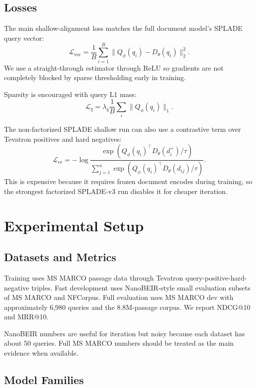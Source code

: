 \documentclass[
]{ceurart}
\begin{document}
\subsection{Losses}

The main shallow-alignment loss matches the full document model's SPLADE query
vector:
\begin{equation}
  \mathcal{L}_{\mathrm{vec}} =
  \frac{1}{B}\sum_{i=1}^B \|Q_\phi(q_i) - D_\theta(q_i)\|_2^2.
\end{equation}
We use a straight-through estimator through ReLU so gradients are not completely
blocked by sparse thresholding early in training.

Sparsity is encouraged with query L1 mass:
\begin{equation}
  \mathcal{L}_{q} = \lambda_q \frac{1}{B}\sum_i \|Q_\phi(q_i)\|_1.
\end{equation}

The non-factorized SPLADE shallow run can also use a contrastive term over
Tevatron positives and hard negatives:
\begin{equation}
  \mathcal{L}_{\mathrm{ce}} =
  -\log
  \frac{\exp(Q_\phi(q_i)^\top D_\theta(d_i^+) / \tau)}
       {\sum_{j=1}^{n}\exp(Q_\phi(q_i)^\top D_\theta(d_{ij}) / \tau)}.
\end{equation}
This is expensive because it requires frozen document encodes during training,
so the strongest factorized SPLADE-v3 run disables it for cheaper iteration.

\section{Experimental Setup}

\subsection{Datasets and Metrics}

Training uses MS MARCO passage data \cite{Bajaj2016MSMARCO} through Tevatron
query-positive-hard-negative triples. Fast development uses NanoBEIR-style small
evaluation subsets of MS MARCO and NFCorpus. Full evaluation uses MS MARCO dev
with approximately 6,980 queries and the 8.8M-passage corpus. We report NDCG@10
and MRR@10.

NanoBEIR numbers are useful for iteration but noisy because each dataset has
about 50 queries. Full MS MARCO numbers should be treated as the main evidence
when available.

\subsection{Model Families}
\end{document}
